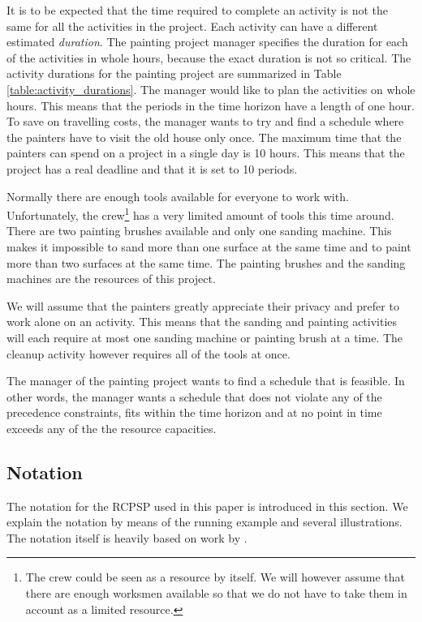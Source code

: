 \documentclass{article}
\theoremstyle{definition}
\begin{document}
It is to be expected that the time required to complete an activity is not the same for all the activities in the project. 
Each activity can have a different estimated \emph{duration}.
The painting project manager specifies the duration for each of the activities in whole hours, because the exact duration is not so critical. 
The activity durations for the painting project are summarized in Table \ref{table:activity_durations}. 
The manager would like to plan the activities on whole hours. 
This means that the periods in the time horizon have a length of one hour. 
To save on travelling costs, the manager wants to try and find a schedule where the painters have to visit the old house only once. 
The maximum time that the painters can spend on a project in a single day is 10 hours. 
This means that the project has a real deadline and that it is set to 10 periods. 

Normally there are enough tools available for everyone to work with.
Unfortunately, the crew\footnote{The crew could be seen as a resource by itself. We will however assume that there are enough worksmen available so that we do not have to take them in account as a limited resource. } has a very limited amount of tools this time around.
There are two painting brushes available and only one sanding machine. 
This makes it impossible to sand more than one surface at the same time and to paint more than two surfaces at the same time.
The painting brushes and the sanding machines are the resources of this project. 

We will assume that the painters greatly appreciate their privacy and prefer to work alone on an activity. This means that the sanding and painting activities will each require at most one sanding machine or painting brush at a time. 
The cleanup activity however requires all of the tools at once. 

The manager of the painting project wants to find a schedule that is feasible. 
In other words, the manager wants a schedule that does not violate any of the precedence constraints, fits within the time horizon and at no point in time exceeds any of the the resource capacities. 

\subsection{Notation}
\label{text:RCPSP_notation}
The notation for the RCPSP used in this paper is introduced in this section. We explain the notation by means of the running example and several illustrations. The notation itself is heavily based on work by \citet{brucker99}. 
\end{document}

